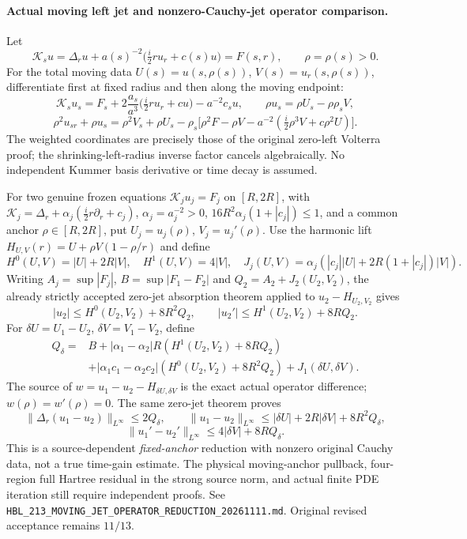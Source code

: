 \paragraph{Actual moving left jet and nonzero-Cauchy-jet operator comparison.}
Let
\[
 \mathcal K_su=\Delta_ru+a(s)^{-2}
  \bigl(\tfrac{i}{2}ru_r+c(s)u\bigr)=F(s,r),
 \qquad \rho=\rho(s)>0.
\]
For the total moving data
$U(s)=u(s,\rho(s))$, $V(s)=u_r(s,\rho(s))$,
differentiate first at fixed radius and then along the moving endpoint:
\[
 \mathcal K_su_s=F_s+
 2\frac{a_s}{a^3}\bigl(\tfrac{i}{2}ru_r+cu\bigr)-a^{-2}c_su,
 \qquad
 \rho u_s=\rho U_s-\rho\rho_sV,
\]
\[
 \boxed{\rho^2u_{sr}+\rho u_s
 =\rho^2V_s+\rho U_s-
 \rho_s\bigl[\rho^2F-\rho V
  -a^{-2}(\tfrac{i}{2}\rho^3V+c\rho^2U)\bigr].}
\]
The weighted coordinates are precisely those of the original
zero-left Volterra proof; the shrinking-left-radius inverse
factor cancels algebraically. No independent Kummer basis
derivative or time decay is assumed.

For two genuine frozen equations
$\mathcal K_ju_j=F_j$ on $[R,2R]$, with
$\mathcal K_j=\Delta_r+\alpha_j(\tfrac{i}{2}r\partial_r+c_j)$,
$\alpha_j=a_j^{-2}>0$,
$16R^2\alpha_j(1+|c_j|)\le1$,
and a common anchor $\rho\in[R,2R]$, put
$U_j=u_j(\rho)$, $V_j=u_j'(\rho)$.
Use the harmonic lift
$H_{U,V}(r)=U+\rho V(1-\rho/r)$ and define
\[
 H^0(U,V)=|U|+2R|V|,\quad H^1(U,V)=4|V|,
 \quad J_j(U,V)=\alpha_j
 (|c_j||U|+2R(1+|c_j|)|V|).
\]
Writing $A_j=\sup|F_j|$, $B=\sup|F_1-F_2|$ and
$Q_2=A_2+J_2(U_2,V_2)$, the already strictly
accepted zero-jet absorption theorem applied to $u_2-H_{U_2,V_2}$
gives
\[
 |u_2|\le H^0(U_2,V_2)+8R^2Q_2,\qquad
 |u_2'|\le H^1(U_2,V_2)+8RQ_2.
\]
For $\delta U=U_1-U_2$, $\delta V=V_1-V_2$, define
\[
\begin{aligned}
 Q_\delta={}&B+|\alpha_1-\alpha_2|R
 (H^1(U_2,V_2)+8RQ_2)\\
 &+|\alpha_1c_1-\alpha_2c_2|
 (H^0(U_2,V_2)+8R^2Q_2)+J_1(\delta U,\delta V).
\end{aligned}
\]
The source of $w=u_1-u_2-H_{\delta U,\delta V}$
is the exact actual operator difference; $w(\rho)=w'(\rho)=0$.
The same zero-jet theorem proves
\[
 \|\Delta_r(u_1-u_2)\|_{L^\infty}\le2Q_\delta,\qquad
 \|u_1-u_2\|_{L^\infty}\le
 |\delta U|+2R|\delta V|+8R^2Q_\delta,
\]
\[
 \|u_1'-u_2'\|_{L^\infty}\le4|\delta V|+8RQ_\delta.
\]
This is a source-dependent \emph{fixed-anchor} reduction with
nonzero original Cauchy data, not a true time-gain estimate.
The physical moving-anchor pullback, four-region full Hartree
residual in the strong source norm, and actual finite PDE
iteration still require independent proofs.
See \texttt{HBL\_213\_MOVING\_JET\_OPERATOR\_REDUCTION\_20261111.md}.
Original revised acceptance remains $11/13$.
